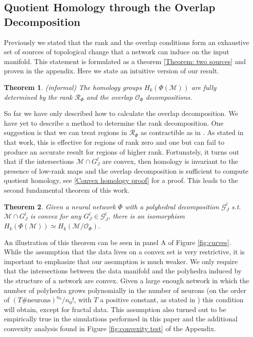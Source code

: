 \documentclass[10pt]{article} %
\theoremstyle{plain}
\newtheorem{theorem}{Theorem}[section]
\theoremstyle{definition}
\theoremstyle{remark}
\begin{document}
\subsection{Quotient Homology through the Overlap Decomposition}

Previously we stated that the rank and the overlap conditions form an exhaustive set of sources of topological change that a network can induce on the input manifold. This statement is formulated as a theorem  \ref{Theorem: two sources} and proven in the appendix. Here we state an intuitive version of our result.

\begin{theorem}
\label{Homology decomp theorem}
    (informal) The homology groups $H_k(\Phi(\mathcal{M}))$ are fully determined by the rank $\mathcal{R}_\Phi$ and the overlap $\mathcal{O}_\Phi$ decompositions.
\end{theorem}

So far we have only described how to calculate the overlap decomposition. We have yet to describe a method to determine the rank decomposition. One suggestion is that we can treat regions in $\mathcal{R}_\Phi$ as contractible as in \citet{beshkov2024rank}. As stated in that work, this is effective for regions of rank zero and one but can fail to produce an accurate result for regions of higher rank. Fortunately, it turns out that if the intersections $\mathcal{M} \cap G^l_J$ are convex, then homology is invariant to the presence of low-rank maps and the overlap decomposition is sufficient to compute quotient homology, see \ref{Convex homology proof} for a proof. This leads to the second fundamental theorem of this work.

\begin{theorem}
    \label{Convex homology theorem}
    Given a neural network $\Phi$ with a polyhedral decomposition $\mathcal{G}^l_J$ s.t. $\mathcal{M} \cap G^l_J$ is convex for any $G^l_J \in \mathcal{G}^l_J$, there is an isomorphism $H_k(\Phi(\mathcal{M})) \simeq H_k(\mathcal{M}/ \mathcal{O}_\Phi)$.
\end{theorem}

An illustration of this theorem can be seen in panel A of Figure \ref{fig:curves}. While the assumption that the data lives on a convex set is very restrictive, it is important to emphasize that our assumption is much weaker. We only require that the intersections between the data manifold and the polyhedra induced by the structure of a network are convex. Given a large enough network in which the number of polyhedra grows polynomially in the number of neurons (on the order of $(T\#\text{neurons})^{n_0}/n_0!$, with $T$ a positive constant, as stated in \cite{hanin2019deep}) this condition will obtain, except for fractal data. This assumption also turned out to be empirically true in the simulations performed in this paper and the additional convexity analysis found in Figure \ref{fig:convexity test} of the Appendix.
\end{document}
